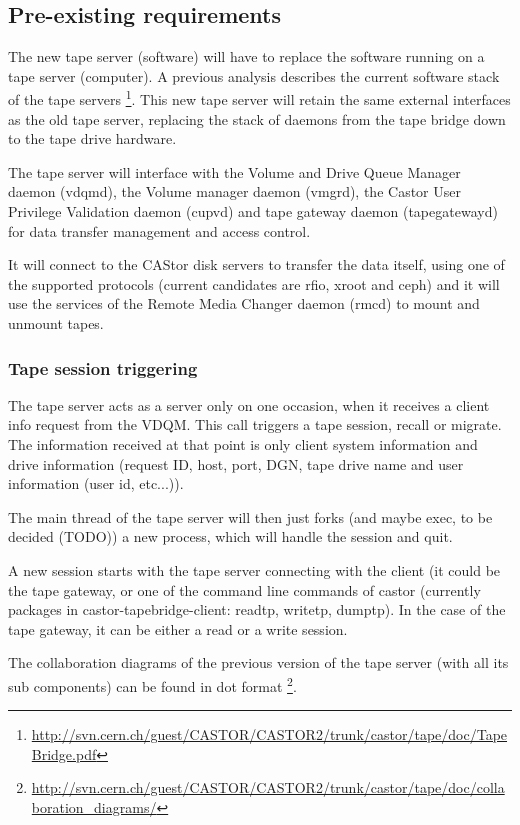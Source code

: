 \subsection{Pre-existing requirements}

The new tape server (software) will have to replace the software running on a tape server
(computer). A previous analysis describes the current software stack of the tape servers
	\footnote{ \href{http://svn.cern.ch/guest/CASTOR/CASTOR2/trunk/castor/tape/doc/TapeBridge.pdf}
	{http://svn.cern.ch/guest/CASTOR/CASTOR2/trunk/castor/tape/doc/TapeBridge.pdf}}.
This new tape server will retain the same external interfaces as the old tape server, replacing 
the stack of daemons from the tape bridge down to the tape drive hardware.

The tape server will interface with the Volume and Drive Queue Manager daemon (vdqmd), the Volume
manager daemon (vmgrd), the Castor User Privilege Validation daemon (cupvd) and tape gateway 
daemon (tapegatewayd) for data transfer management and access control.

It will connect to the CAStor disk servers to transfer the data itself, using one of the supported
protocols (current candidates are rfio, xroot and ceph) and it will use the services of the Remote 
Media Changer daemon (rmcd) to mount and unmount tapes.

\subsubsection{Tape session triggering}

The tape server acts as a server only on one occasion, when it receives a client info request from the 
VDQM. This call triggers a tape session, recall or migrate. The information received at that point
is only client system information and drive information (request ID, host, port, DGN, tape drive name and user information (user id, etc...)).

The main thread of the tape server will then just forks (and maybe exec, to be decided (TODO)) a new
process, which will handle the session and quit.

A new session starts with the tape server connecting with the client (it could be the tape gateway, or one of the command line commands of castor (currently packages in castor-tapebridge-client: readtp, writetp, 
dumptp). In the case of the tape gateway, it can be either a read or a write session.

The collaboration diagrams of the previous version of the tape server (with all its sub components)
can be found in dot format
	\footnote{ \href{http://svn.cern.ch/guest/CASTOR/CASTOR2/trunk/castor/tape/doc/collaboration\_diagrams/}
	{http://svn.cern.ch/guest/CASTOR/CASTOR2/trunk/castor/tape/doc/collaboration\_diagrams/}}.
	
